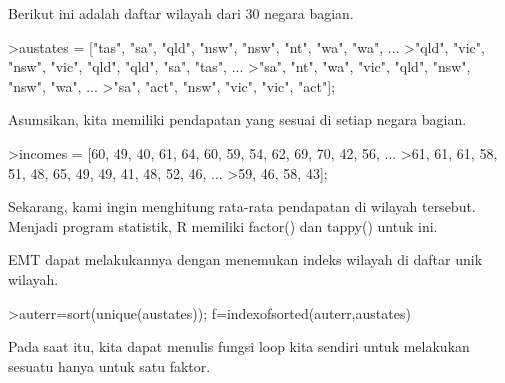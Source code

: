 \documentclass[a4paper,10pt]{article}
\begin{document}
\begin{eulernotebook}
\begin{eulercomment}
\begin{eulercomment}
\begin{eulercomment}
\begin{eulercomment}
\begin{eulercomment}
\begin{eulercomment}
\begin{eulercomment}
\begin{eulercomment}
\begin{eulercomment}
\begin{eulercomment}
\begin{eulercomment}
\begin{eulercomment}
\begin{eulercomment}
\begin{eulercomment}
\begin{eulercomment}
\begin{eulercomment}
\begin{eulercomment}
\begin{eulercomment}
\begin{eulercomment}
Berikut ini adalah daftar wilayah dari 30 negara bagian.
\end{eulercomment}
\begin{eulerprompt}
>austates = ["tas", "sa", "qld", "nsw", "nsw", "nt", "wa", "wa", ...
>"qld", "vic", "nsw", "vic", "qld", "qld", "sa", "tas", ...
>"sa", "nt", "wa", "vic", "qld", "nsw", "nsw", "wa", ...
>"sa", "act", "nsw", "vic", "vic", "act"];
\end{eulerprompt}
\begin{eulercomment}
Asumsikan, kita memiliki pendapatan yang sesuai di setiap negara
bagian.
\end{eulercomment}
\begin{eulerprompt}
>incomes = [60, 49, 40, 61, 64, 60, 59, 54, 62, 69, 70, 42, 56, ...
>61, 61, 61, 58, 51, 48, 65, 49, 49, 41, 48, 52, 46, ...
>59, 46, 58, 43];
\end{eulerprompt}
\begin{eulercomment}
Sekarang, kami ingin menghitung rata-rata pendapatan di wilayah
tersebut. Menjadi program statistik, R memiliki factor() dan tappy()
untuk ini.

EMT dapat melakukannya dengan menemukan indeks wilayah di daftar unik
wilayah.
\end{eulercomment}
\begin{eulerprompt}
>auterr=sort(unique(austates)); f=indexofsorted(auterr,austates)
\end{eulerprompt}
\begin{euleroutput}
  [6,  5,  4,  2,  2,  3,  8,  8,  4,  7,  2,  7,  4,  4,  5,  6,  5,  3,
  8,  7,  4,  2,  2,  8,  5,  1,  2,  7,  7,  1]
\end{euleroutput}
\begin{eulercomment}
Pada saat itu, kita dapat menulis fungsi loop kita sendiri untuk
melakukan sesuatu hanya untuk satu faktor.


\end{eulercomment}
\end{eulercomment}
\end{eulercomment}
\end{eulercomment}
\end{eulercomment}
\end{eulercomment}
\end{eulercomment}
\end{eulercomment}
\end{eulercomment}
\end{eulercomment}
\end{eulercomment}
\end{eulercomment}
\end{eulercomment}
\end{eulercomment}
\end{eulercomment}
\end{eulercomment}
\end{eulercomment}
\end{eulercomment}
\end{eulercomment}
\end{eulernotebook}
\end{document}
